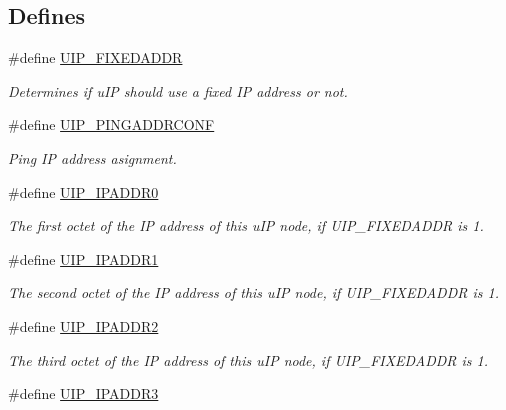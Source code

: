\subsection*{Defines}
\begin{CompactItemize}
\item 
\#define \hyperlink{a00071_g51195ea7cd5aa387a87f9d3b23905b62}{UIP\_\-FIXEDADDR}
\begin{CompactList}\small\item\em Determines if u\-IP should use a fixed IP address or not. \item\end{CompactList}\item 
\#define \hyperlink{a00071_g9069474ea570fd78c481aa164317dbaf}{UIP\_\-PINGADDRCONF}
\begin{CompactList}\small\item\em Ping IP address asignment. \item\end{CompactList}\item 
\hypertarget{a00071_g0facfb44aa4e7176d0f1c38670a0397f}{
\#define \hyperlink{a00071_g0facfb44aa4e7176d0f1c38670a0397f}{UIP\_\-IPADDR0}}
\label{a00071_g0facfb44aa4e7176d0f1c38670a0397f}

\begin{CompactList}\small\item\em The first octet of the IP address of this u\-IP node, if UIP\_\-FIXEDADDR is 1. \item\end{CompactList}\item 
\hypertarget{a00071_gb74cfea1049b4632926ec8afc8a0aa2a}{
\#define \hyperlink{a00071_gb74cfea1049b4632926ec8afc8a0aa2a}{UIP\_\-IPADDR1}}
\label{a00071_gb74cfea1049b4632926ec8afc8a0aa2a}

\begin{CompactList}\small\item\em The second octet of the IP address of this u\-IP node, if UIP\_\-FIXEDADDR is 1. \item\end{CompactList}\item 
\hypertarget{a00071_g493075d5d1f5fae1eff7aa7bea2b9ca7}{
\#define \hyperlink{a00071_g493075d5d1f5fae1eff7aa7bea2b9ca7}{UIP\_\-IPADDR2}}
\label{a00071_g493075d5d1f5fae1eff7aa7bea2b9ca7}

\begin{CompactList}\small\item\em The third octet of the IP address of this u\-IP node, if UIP\_\-FIXEDADDR is 1. \item\end{CompactList}\item 
\hypertarget{a00071_g962e0ce14baef52129745780b1a45730}{
\#define \hyperlink{a00071_g962e0ce14baef52129745780b1a45730}{UIP\_\-IPADDR3}}
\label{a00071_g962e0ce14baef52129745780b1a45730}


\end{CompactItemize}
